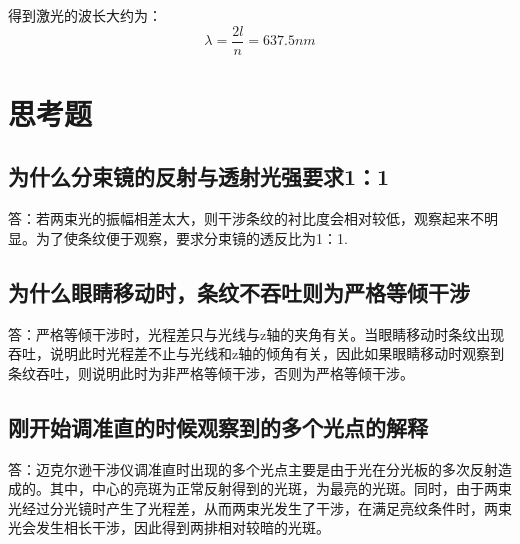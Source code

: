 \documentclass[a4paper, 10pt]{article}
\begin{document}
得到激光的波长大约为：
$$\lambda=\frac{2l}{n}=637.5nm$$

\section{思考题}
\subsection{为什么分束镜的反射与透射光强要求1：1}
\noindent 答：若两束光的振幅相差太大，则干涉条纹的衬比度会相对较低，观察起来不明显。为了使条纹便于观察，要求分束镜的透反比为1：1.
\subsection{为什么眼睛移动时，条纹不吞吐则为严格等倾干涉}
\noindent 答：严格等倾干涉时，光程差只与光线与z轴的夹角有关。当眼睛移动时条纹出现吞吐，说明此时光程差不止与光线和z轴的倾角有关，因此如果眼睛移动时观察到条纹吞吐，则说明此时为非严格等倾干涉，否则为严格等倾干涉。
\subsection{刚开始调准直的时候观察到的多个光点的解释}
\noindent 答：‌迈克尔逊干涉仪调准直时出现的多个光点主要是由于光在分光板的多次反射造成的。其中，中心的亮斑为正常反射得到的光斑，为最亮的光斑。同时，由于两束光经过分光镜时产生了光程差，从而两束光发生了干涉，在满足亮纹条件时，两束光会发生相长干涉，因此得到两排相对较暗的光斑。
\end{document}
